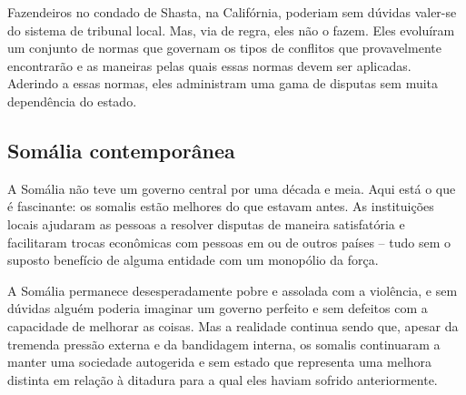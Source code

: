 Fazendeiros no condado de Shasta, na Califórnia, poderiam sem dúvidas valer-se do sistema de tribunal local. Mas, via de regra, eles não o fazem. Eles evoluíram um conjunto de normas que governam os tipos de conflitos que provavelmente encontrarão e as maneiras pelas quais essas normas devem ser aplicadas. Aderindo a essas normas, eles administram uma gama de disputas sem muita dependência do estado.

\subsection*{Somália contemporânea}

A Somália não teve um governo central por uma década e meia. Aqui está o que é fascinante: os somalis estão melhores do que estavam antes. As instituições locais ajudaram as pessoas a resolver disputas de maneira satisfatória e facilitaram trocas econômicas com pessoas em ou de outros países -- tudo sem o suposto benefício de alguma entidade com um monopólio da força.

A Somália permanece desesperadamente pobre e assolada com a violência, e sem dúvidas alguém poderia imaginar um governo perfeito e sem defeitos com a capacidade de melhorar as coisas. Mas a realidade continua sendo que, apesar da tremenda pressão externa e da bandidagem interna, os somalis continuaram a manter uma sociedade autogerida e sem estado que representa uma melhora distinta em relação à ditadura para a qual eles haviam sofrido anteriormente.

